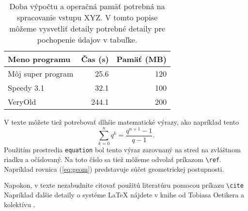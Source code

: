\begin{table}
\caption[Doba výpočtu a operačná pamäť potrebná na spracovanie vstupu XYZ]{Doba výpočtu a operačná pamäť potrebná na spracovanie vstupu XYZ. V tomto popise môžeme vysvetliť detaily potrebné detaily pre pochopenie údajov v tabuľke.}
\label{tab:cas}
\begin{center}
\begin{tabular}{lrr}
\hline 
Meno programu & Čas (s) & Pamäť (MB) \\
\hline
Môj super program & 25.6 & 120 \\
Speedy 3.1  & 32.1 & 100 \\
VeryOld & 244.1 & 200 \\
\hline
\end{tabular}
\end{center}
\end{table}

V texte môžete tiež potrebovať dlhšie matematické výrazy, ako napríklad tento
\begin{equation}
\sum_{k=0}^n q^k = \frac{q^{n+1}-1}{q-1}.
\label{eq:geom}
\end{equation}
Použitím prostredia \verb'equation' bol tento výraz zarovnaný na stred na
zvláštnom riadku a očíslovaný. Na toto číslo sa tiež môžeme odvolať
príkazom \verb'\ref'. Napríklad rovnica (\ref{eq:geom}) predstavuje súčet 
geometrickej postupnosti.

Napokon, v texte nezabudnite citovať použitú literatúru pomocou príkazu 
\verb'\cite'  Napríklad ďalšie detaily o systéme LaTeX nájdete v knihe od Tobiasa Oetikera a kolektívu \cite{Oetiker2000}.



